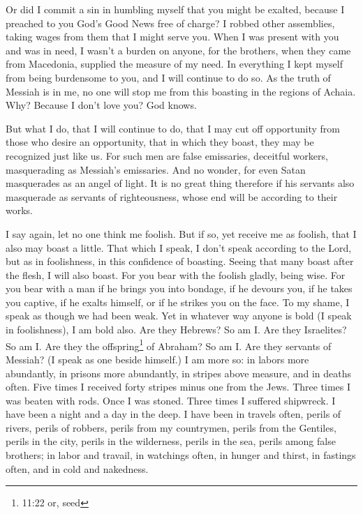\myverse{}Or did I commit a sin in humbling myself that you might be exalted,
because I preached to you God’s Good News free of charge?
\myverse{}I robbed other assemblies, taking wages from them that I might serve you.
\myverse{}When I was present with you and was in need, I wasn’t a burden on anyone, for
the brothers, when they came from Macedonia, supplied the measure of my need. In everything I kept myself
from being burdensome to you, and I will continue to do so.
\myverse{}As the truth of Messiah is in me, no one will stop me from this boasting
in the regions of Achaia.
\myverse{}Why? Because I don’t love you? God knows.

\myverse{}But what I do, that I will continue to do, that I may cut off
opportunity from those who desire an opportunity, that in which they boast, they may be recognized just
like us.
\myverse{}For such men are false emissaries, deceitful workers, masquerading as Messiah’s
emissaries.
\myverse{}And no wonder, for even Satan masquerades as an angel of light.
\myverse{}It is no great thing therefore if his servants also masquerade as servants
of righteousness, whose end will be according to their works.

\myverse{}I say again, let no one think me foolish. But if so, yet receive
me as foolish, that I also may boast a little.
\myverse{}That which I speak, I don’t speak according to the Lord, but as in foolishness,
in this confidence of boasting.
\myverse{}Seeing that many boast after the flesh, I will also boast.
\myverse{}For you bear with the foolish gladly, being wise.
\myverse{}For you bear with a man if he brings you into bondage, if he devours you,
if he takes you captive, if he exalts himself, or if he strikes you on the face.
\myverse{}To my shame, I speak as though we had been weak. Yet in whatever way anyone
is bold (I speak in foolishness), I am bold also.
\myverse{}Are they Hebrews? So am I. Are they Israelites? So am I. Are they the offspring\footnote{11:22 or, seed} of Abraham? So am I.
\myverse{}Are they servants of Messiah? (I speak as one beside himself.) I am more
so: in labors more abundantly, in prisons more abundantly, in stripes above measure, and in deaths often.
\myverse{}Five times I received forty stripes minus one from the Jews.
\myverse{}Three times I was beaten with rods. Once I was stoned. Three times I suffered
shipwreck. I have been a night and a day in the deep.
\myverse{}I have been in travels often, perils of rivers, perils of robbers, perils
from my countrymen, perils from the Gentiles, perils in the city, perils in the wilderness, perils in
the sea, perils among false brothers;
\myverse{}in labor and travail, in watchings often, in hunger and thirst, in fastings
often, and in cold and nakedness.

